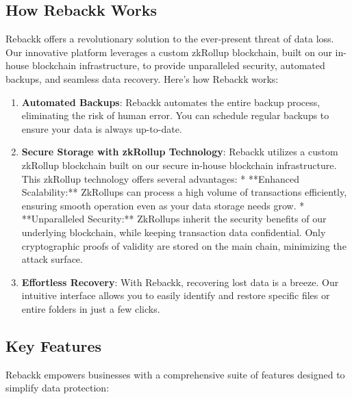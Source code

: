 \documentclass[12pt]{article}
\begin{document}
\subsection{How Rebackk Works}

Rebackk offers a revolutionary solution to the ever-present threat of data loss. Our innovative platform leverages a custom zkRollup blockchain, built on our in-house blockchain infrastructure, to provide unparalleled security, automated backups, and seamless data recovery. Here's how Rebackk works:

\begin{enumerate}
    \item \textbf{Automated Backups}: Rebackk automates the entire backup process, eliminating the risk of human error. You can schedule regular backups to ensure your data is always up-to-date.
    \item \textbf{Secure Storage with zkRollup Technology}: Rebackk utilizes a custom zkRollup blockchain built on our secure in-house blockchain infrastructure. This zkRollup technology offers several advantages:
        * **Enhanced Scalability:** ZkRollups can process a high volume of transactions efficiently, ensuring smooth operation even as your data storage needs grow.
        * **Unparalleled Security:** ZkRollups inherit the security benefits of our underlying blockchain, while keeping transaction data confidential. Only cryptographic proofs of validity are stored on the main chain, minimizing the attack surface.
    \item \textbf{Effortless Recovery}: With Rebackk, recovering lost data is a breeze.  Our intuitive interface allows you to easily identify and restore specific files or entire folders in just a few clicks.
\end{enumerate}

\subsection{Key Features}

Rebackk empowers businesses with a comprehensive suite of features designed to simplify data protection:
\end{document}
